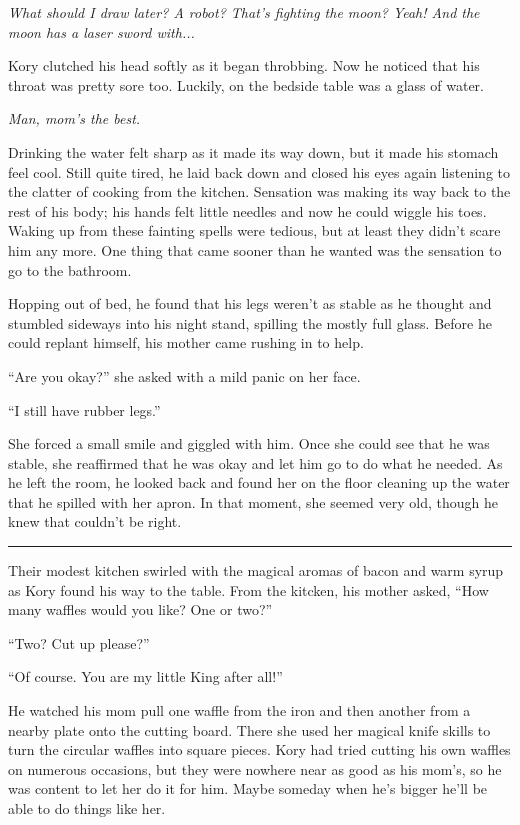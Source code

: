 \documentclass[9pt]{memoir}
\renewcommand{\line}{\noindent \rule{\textwidth}{1pt} \vspace{1em}}
\begin{document}
\textit{What should I draw later? A robot? That's fighting the moon? Yeah! And the moon has a laser sword with...}

Kory clutched his head softly as it began throbbing. Now he noticed that his throat was pretty sore too. Luckily, on the bedside table was a glass of water.

\textit{Man, mom's the best.}

Drinking the water felt sharp as it made its way down, but it made his stomach feel cool. Still quite tired, he laid back down and closed his eyes again listening to the clatter of cooking from the kitchen. Sensation was making its way back to the rest of his body; his hands felt little needles and now he could wiggle his toes. Waking up from these fainting spells were tedious, but at least they didn't scare him any more. One thing that came sooner than he wanted was the sensation to go to the bathroom.

Hopping out of bed, he found that his legs weren't as stable as he thought and stumbled sideways into his night stand, spilling the mostly full glass. Before he could replant himself, his mother came rushing in to help.

``Are you okay?'' she asked with a mild panic on her face.

``I still have rubber legs.''

She forced a small smile and giggled with him. Once she could see that he was stable, she reaffirmed that he was okay and let him go to do what he needed. As he left the room, he looked back and found her on the floor cleaning up the water that he spilled with her apron. In that moment, she seemed very old, though he knew that couldn't be right.

\line

Their modest kitchen swirled with the magical aromas of bacon and warm syrup as Kory found his way to the table. From the kitcken, his mother asked, ``How many waffles would you like? One or two?''

``Two? Cut up please?''

``Of course. You are my little King after all!''

He watched his mom pull one waffle from the iron and then another from a nearby plate onto the cutting board. There she used her magical knife skills to turn the circular waffles into square pieces. Kory had tried cutting his own waffles on numerous occasions, but they were nowhere near as good as his mom's, so he was content to let her do it for him. Maybe someday when he's bigger he'll be able to do things like her.
\end{document}

